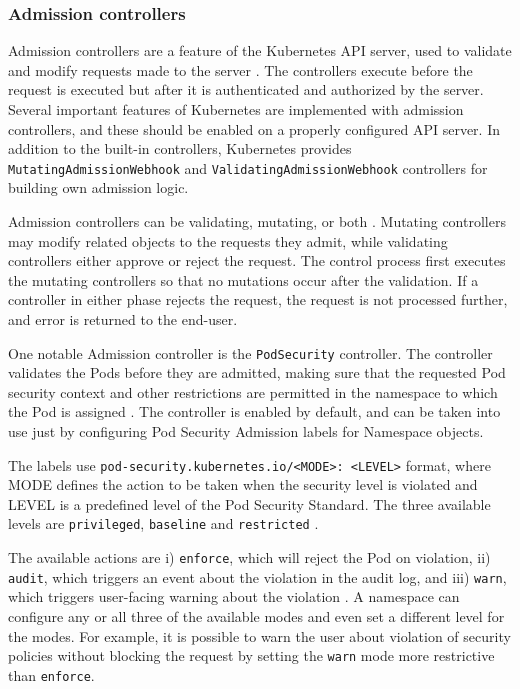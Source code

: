 \documentclass[english, 12pt, a4paper, sci, utf8, a-2b, online]{aaltothesis}
\begin{document}
\subsubsection{Admission controllers} \label{admission-controllers}

Admission controllers are a feature of the Kubernetes API server, used to validate and modify requests made to the server \cite{k8s-docs-admission}. The controllers execute before the request is executed but after it is authenticated and authorized by the server. Several important features of Kubernetes are implemented with admission controllers, and these should be enabled on a properly configured API server. In addition to the built-in controllers, Kubernetes provides \texttt{MutatingAdmissionWebhook} and \texttt{ValidatingAdmissionWebhook} controllers for building own admission logic.

Admission controllers can be validating, mutating, or both \cite{k8s-docs-admission}. Mutating controllers may modify related objects to the requests they admit, while validating controllers either approve or reject the request. The control process first executes the mutating controllers so that no mutations occur after the validation. If a controller in either phase rejects the request, the request is not processed further, and error is returned to the end-user.

One notable Admission controller is the \texttt{PodSecurity} controller. The controller validates the Pods before they are admitted, making sure that the requested Pod security context and other restrictions are permitted in the namespace to which the Pod is assigned \cite{k8s-docs-admission}. The controller is enabled by default, and can be taken into use just by configuring Pod Security Admission labels for Namespace objects.

The labels use \texttt{pod-security.kubernetes.io/<MODE>: <LEVEL>} format, where MODE defines the action to be taken when the security level is violated and LEVEL is a predefined level of the Pod Security Standard. The three available levels are \texttt{privileged}, \texttt{baseline} and \texttt{restricted} \cite{k8s-docs-pss}.

The available actions are i) \texttt{enforce}, which will reject the Pod on violation, ii) \texttt{audit}, which triggers an event about the violation in the audit log, and iii) \texttt{warn}, which triggers user-facing warning about the violation \cite{k8s-docs-psa}. A namespace can configure any or all three of the available modes and even set a different level for the modes. For example, it is possible to warn the user about violation of security policies without blocking the request by setting the \texttt{warn} mode more restrictive than \texttt{enforce}.
\end{document}
